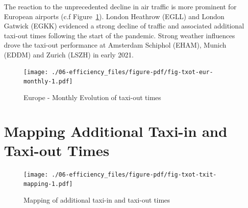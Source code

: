 \documentclass[
  a4paper,
  DIV=11,
  numbers=noendperiod]{scrreport}
\begin{document}
The reaction to the unprecedented decline in air traffic is more
prominent for European airports (c.f Figure~\ref{fig-txot-eur-monthly}).
London Heathrow (EGLL) and London Gatwick (EGKK) evidenced a strong
decline of traffic and associated additional taxi-out times following
the start of the pandemic. Strong weather influences drove the taxi-out
performance at Amsterdam Schiphol (EHAM), Munich (EDDM) and Zurich
(LSZH) in early 2021.

\begin{figure}[H]

{\centering \texttt{[image: ./06-efficiency\_files/figure-pdf/fig-txot-eur-monthly-1.pdf]}

}

\caption{\label{fig-txot-eur-monthly}Europe - Monthly Evolution of
taxi-out times}

\end{figure}

\hypertarget{mapping-additional-taxi-in-and-taxi-out-times}{%
\section{Mapping Additional Taxi-in and Taxi-out
Times}\label{mapping-additional-taxi-in-and-taxi-out-times}}

\begin{figure}[H]

{\centering \texttt{[image: ./06-efficiency\_files/figure-pdf/fig-txot-txit-mapping-1.pdf]}

}

\caption{\label{fig-txot-txit-mapping}Mapping of additional taxi-in and
taxi-out times}

\end{figure}
\end{document}
